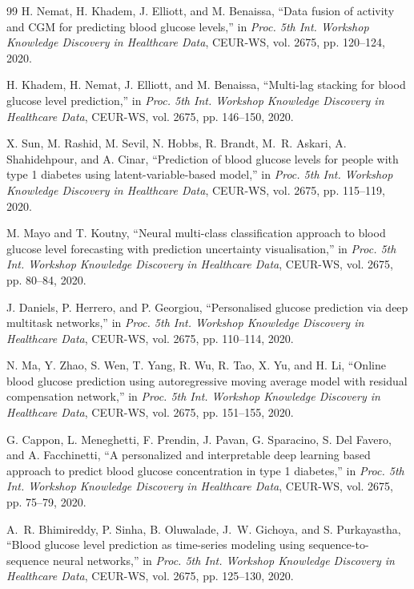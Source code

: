 \documentclass[journal]{IEEEtran}
\begin{document}
\begin{thebibliography}{99}
\label{ref66label} H. Nemat, H. Khadem, J. Elliott, and M. Benaissa, ``Data fusion of activity and CGM for predicting blood glucose levels,'' in \emph{Proc. 5th Int. Workshop Knowledge Discovery in Healthcare Data}, CEUR-WS, vol. 2675, pp. 120--124, 2020.

\label{ref67label} H. Khadem, H. Nemat, J. Elliott, and M. Benaissa, ``Multi-lag stacking for blood glucose level prediction,'' in \emph{Proc. 5th Int. Workshop Knowledge Discovery in Healthcare Data}, CEUR-WS, vol. 2675, pp. 146--150, 2020.

\label{ref68label} X. Sun, M. Rashid, M. Sevil, N. Hobbs, R. Brandt, M.~R. Askari, A. Shahidehpour, and A. Cinar, ``Prediction of blood glucose levels for people with type 1 diabetes using latent-variable-based model,'' in \emph{Proc. 5th Int. Workshop Knowledge Discovery in Healthcare Data}, CEUR-WS, vol. 2675, pp. 115--119, 2020.

\label{ref69label} M. Mayo and T. Koutny, ``Neural multi-class classification approach to blood glucose level forecasting with prediction uncertainty visualisation,'' in \emph{Proc. 5th Int. Workshop Knowledge Discovery in Healthcare Data}, CEUR-WS, vol. 2675, pp. 80--84, 2020.

\label{ref71label} J. Daniels, P. Herrero, and P. Georgiou, ``Personalised glucose prediction via deep multitask networks,'' in \emph{Proc. 5th Int. Workshop Knowledge Discovery in Healthcare Data}, CEUR-WS, vol. 2675, pp. 110--114, 2020.

\label{ref72label} N. Ma, Y. Zhao, S. Wen, T. Yang, R. Wu, R. Tao, X. Yu, and H. Li, ``Online blood glucose prediction using autoregressive moving average model with residual compensation network,'' in \emph{Proc. 5th Int. Workshop Knowledge Discovery in Healthcare Data}, CEUR-WS, vol. 2675, pp. 151--155, 2020.

\label{ref73label} G. Cappon, L. Meneghetti, F. Prendin, J. Pavan, G. Sparacino, S. Del Favero, and A. Facchinetti, ``A personalized and interpretable deep learning based approach to predict blood glucose concentration in type 1 diabetes,'' in \emph{Proc. 5th Int. Workshop Knowledge Discovery in Healthcare Data}, CEUR-WS, vol. 2675, pp. 75--79, 2020.

\label{ref74label} A.~R. Bhimireddy, P. Sinha, B. Oluwalade, J.~W. Gichoya, and S. Purkayastha, ``Blood glucose level prediction as time-series modeling using sequence-to-sequence neural networks,'' in \emph{Proc. 5th Int. Workshop Knowledge Discovery in Healthcare Data}, CEUR-WS, vol. 2675, pp. 125--130, 2020.


\end{thebibliography}
\end{document}

